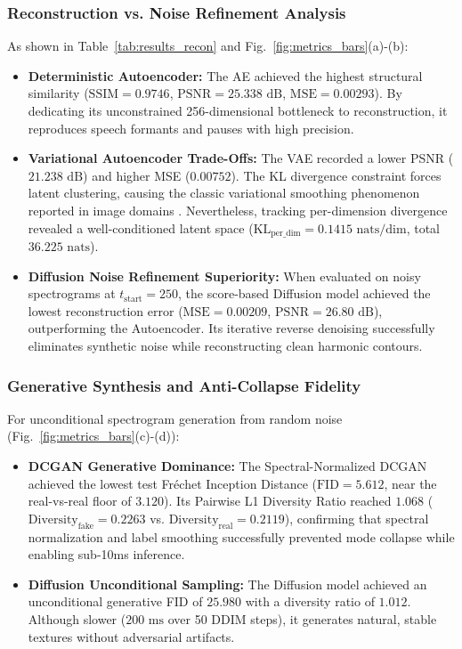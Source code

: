 \documentclass[conference]{IEEEtran}
\begin{document}
\subsubsection{Reconstruction vs. Noise Refinement Analysis}
As shown in Table~\ref{tab:results_recon} and Fig.~\ref{fig:metrics_bars}(a)-(b):
\begin{itemize}
    \item \textbf{Deterministic Autoencoder:} The AE achieved the highest structural similarity ($\text{SSIM} = 0.9746$, $\text{PSNR} = 25.338\text{ dB}$, $\text{MSE} = 0.00293$). By dedicating its unconstrained 256-dimensional bottleneck to reconstruction, it reproduces speech formants and pauses with high precision.
    \item \textbf{Variational Autoencoder Trade-Offs:} The VAE recorded a lower PSNR ($21.238\text{ dB}$) and higher MSE ($0.00752$). The KL divergence constraint forces latent clustering, causing the classic variational smoothing phenomenon reported in image domains \cite{mane2026colorization, kharkate2026skin}. Nevertheless, tracking per-dimension divergence revealed a well-conditioned latent space ($\text{KL}_{\text{per\_dim}} = 0.1415\text{ nats/dim}$, total $36.225\text{ nats}$).
    \item \textbf{Diffusion Noise Refinement Superiority:} When evaluated on noisy spectrograms at $t_{\text{start}} = 250$, the score-based Diffusion model achieved the lowest reconstruction error ($\text{MSE} = 0.00209$, $\text{PSNR} = 26.80\text{ dB}$), outperforming the Autoencoder. Its iterative reverse denoising successfully eliminates synthetic noise while reconstructing clean harmonic contours.
\end{itemize}

\subsubsection{Generative Synthesis and Anti-Collapse Fidelity}
For unconditional spectrogram generation from random noise (Fig.~\ref{fig:metrics_bars}(c)-(d)):
\begin{itemize}
    \item \textbf{DCGAN Generative Dominance:} The Spectral-Normalized DCGAN achieved the lowest test Fr\'echet Inception Distance ($\text{FID} = 5.612$, near the real-vs-real floor of $3.120$). Its Pairwise L1 Diversity Ratio reached $1.068$ ($\text{Diversity}_{\text{fake}} = 0.2263$ vs. $\text{Diversity}_{\text{real}} = 0.2119$), confirming that spectral normalization and label smoothing successfully prevented mode collapse while enabling sub-10ms inference.
    \item \textbf{Diffusion Unconditional Sampling:} The Diffusion model achieved an unconditional generative FID of $25.980$ with a diversity ratio of $1.012$. Although slower ($200\text{ ms}$ over 50 DDIM steps), it generates natural, stable textures without adversarial artifacts.
\end{itemize}
\end{document}
